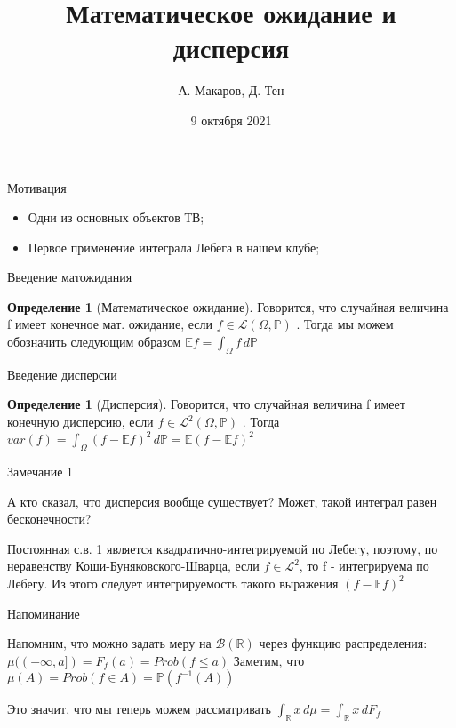 \documentclass{beamer}%
\title{Математическое ожидание и дисперсия}
\author[А. Макаров, Д. Тен]{А. Макаров, Д. Тен}
\institute[Клуб теории вероятностей]{Клуб теории вероятностей ФЭН ВШЭ}
\date{9 октября 2021}
\theoremstyle{definition}
\newtheorem{mydef}[theorem]{Определение}
\begin{document}
\begin{frame}
\titlepage
\end{frame}


\begin{frame}{Мотивация}
\begin{itemize}
    \item Одни из основных объектов ТВ;
    \item Первое применение интеграла Лебега в нашем клубе;

\end{itemize}

\end{frame}


\begin{frame}{Введение матожидания}
    
    \begin{mydef}[Математическое ожидание]
    Говорится, что случайная величина f имеет конечное мат. ожидание, если $f \in \mathcal{L}(\Omega, \mathbb{P})$ . Тогда мы можем обозначить следующим образом 
    $\mathbb{E}f = \int_\Omega f \,d\mathbb{P}$ 
    \end{mydef}
    
\end{frame}

\begin{frame}{Введение дисперсии}
    
    \begin{mydef}[Дисперсия]
    Говорится, что случайная величина f имеет конечную дисперсию, если $f \in \mathcal{L}^2(\Omega, \mathbb{P})$ . Тогда 
    $var(f) = \int_\Omega (f - \mathbb{E}f)^2 \,d\mathbb{P} = \mathbb{E}(f - \mathbb{E}f)^2$
    \end{mydef}
    
    
\end{frame}

\begin{frame}{Замечание 1}
    
    А кто сказал, что дисперсия вообще существует? Может, такой интеграл равен бесконечности?
    
    
    Постоянная с.в. 1 является квадратично-интегрируемой по Лебегу, поэтому, по неравенству Коши-Буняковского-Шварца, если $f \in \mathcal{L}^2$, то f - интегрируема по Лебегу. Из этого следует интегрируемость такого выражения $(f - \mathbb{E}f)^2$
    
\end{frame}

\begin{frame}{Напоминание}
    
    Напомним, что можно задать меру на $\mathcal{B}(\mathbb{R})$ через функцию распределения: $\mu((-\infty,a]) = F_f(a) = Prob(f\leq a)$
    Заметим, что $\mu(A) = Prob(f \in A) = \mathbb{P}(f^{-1}(A))$
    
    Это значит, что мы теперь можем рассматривать $ \int_\mathbb{R}x\,d\mu = \int_\mathbb{R}x\,dF_f$
    
    
\end{frame}
\end{document}
